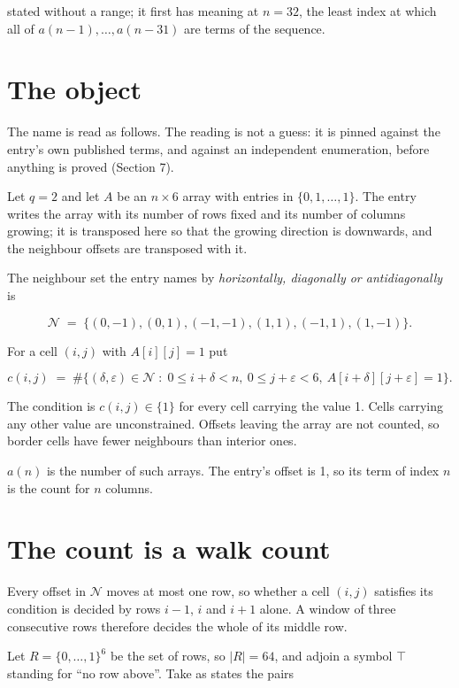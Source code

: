 \documentclass[11pt]{article}
\theoremstyle{definition}
\begin{document}
stated without a range; it first has meaning at $n = 32$, the least index at which all of $a(n-1),\dots,a(n-31)$ are terms of the sequence.

\section{The object}

The name is read as follows. The reading is not a guess: it is pinned against the entry's own published terms, and against an independent enumeration, before anything is proved (Section 7).

Let $q = 2$ and let $A$ be an $n \times 6$ array with entries in $\{0,1,\dots,1\}$. The entry writes the array with its number of rows fixed and its number of columns growing; it is transposed here so that the growing direction is downwards, and the neighbour offsets are transposed with it.

The neighbour set the entry names by {\itshape horizontally, diagonally or antidiagonally} is

\[\mathcal{N} \;=\; \{(0,-1), (0,1), (-1,-1), (1,1), (-1,1), (1,-1)\}.\]

For a cell $(i,j)$ with $A[i][j] = 1$ put

\[c(i,j) \;=\; \#\bigl\{(\delta,\varepsilon)\in\mathcal{N} \;:\; 0\le i+\delta<n,\ 0\le j+\varepsilon<6,\ A[i+\delta][j+\varepsilon] = 1\bigr\}.\]

The condition is $c(i,j) \in \{1\}$ for every cell carrying the value 1. Cells carrying any other value are unconstrained. Offsets leaving the array are not counted, so border cells have fewer neighbours than interior ones.

$a(n)$ is the number of such arrays. The entry's offset is 1, so its term of index $n$ is the count for $n$ columns.

\section{The count is a walk count}

Every offset in $\mathcal{N}$ moves at most one row, so whether a cell $(i,j)$ satisfies its condition is decided by rows $i-1$, $i$ and $i+1$ alone. A window of three consecutive rows therefore decides the whole of its middle row.

Let $R = \{0,\dots,1\}^{6}$ be the set of rows, so $|R| = 64$, and adjoin a symbol $\top$ standing for ``no row above''. Take as states the pairs
\end{document}
